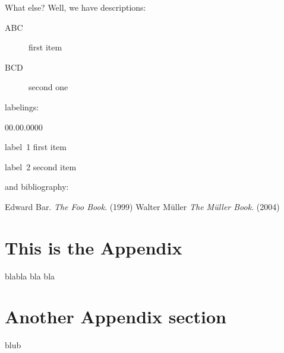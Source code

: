 \documentclass[legalpaper]{article}
\begin{document}
What else? Well, we have descriptions:
\begin{description}
\item[ABC] first item
\item[BCD] second one
\end{description}
labelings:
\begin{lyxlist}{00.00.0000}
\item [label~1] first item
\item [label~2] second item
\end{lyxlist}
and bibliography:
\begin{thebibliography}{9}
 Edward Bar. \emph{The Foo Book}. (1999)
 Walter Müller \emph{The Müller Book}. (2004) 
\end{thebibliography}

\appendix

\section{This is the Appendix}

\noindent blabla bla bla


\section{Another Appendix section}

blub
\end{document}
